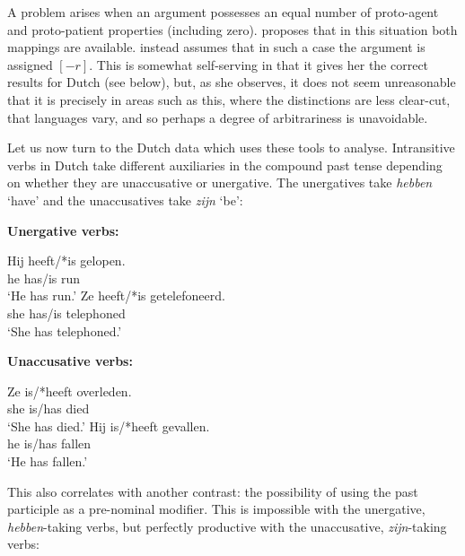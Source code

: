 \documentclass[output=paper]{langscibook}
\begin{document}
A problem arises when an argument possesses an equal number of proto-agent and
proto-patient properties (including zero). \citet[576]{Dowty1991} proposes that
in this situation both mappings are available. \citet[150]{zaenen93} instead
assumes that in such a case the argument is assigned $[-r]$. This is somewhat
self-serving in that it gives her the correct results for Dutch (see below),
but, as she observes, it does not seem unreasonable that it is precisely in
areas such as this, where the distinctions are less clear-cut, that languages
vary, and so perhaps a degree of arbitrariness is unavoidable.

Let us now turn to the Dutch data which \citet{zaenen93} uses these tools to
analyse. Intransitive verbs in Dutch take different auxiliaries in the compound
past tense depending on whether they are unaccusative or unergative. The
unergatives take \textit{hebben} `have' and the unaccusatives take \textit{zijn}
`be':

\newpage
\ea \textbf{Unergative verbs:}
\begin{xlist}
  \ex%
  \gll Hij heeft/*is gelopen.\\
  he has/is run\\
  \glt `He has run.'
  \ex%
  \gll Ze heeft/*is getelefoneerd.\\
  she has/is telephoned\\
  \glt `She has telephoned.'
\end{xlist}
\z

\ea \textbf{Unaccusative verbs:}
\begin{xlist}
  \ex%
  \gll Ze is/*heeft overleden.\\
  she is/has died\\
  \glt `She has died.'%
  \ex%
  \gll Hij  is/*heeft gevallen.\\
  he is/has fallen\\
  \glt `He has fallen.'

\end{xlist}
\z
%
This also correlates with another contrast: the possibility of using the past
participle as a pre-nominal modifier. This is impossible with the unergative,
\textit{hebben}-taking verbs, but perfectly productive with the unaccusative,
\textit{zijn}-taking verbs:

\ea
\begin{xlist}
\end{xlist}
\z
\end{document}
